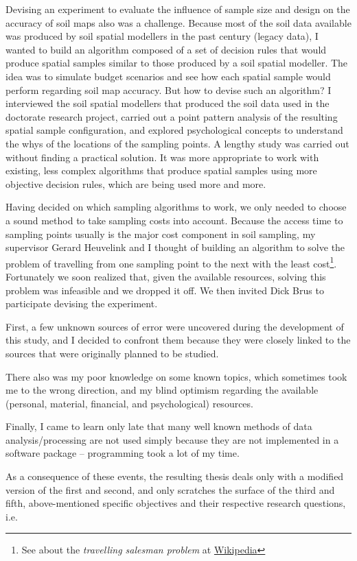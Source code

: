 Devising an experiment to evaluate the influence of sample size and design on the accuracy of soil maps also 
was a challenge. Because most of the soil data available was produced by soil spatial modellers in the past 
century (legacy data), I wanted to build an algorithm composed of a set of decision rules that would produce 
spatial samples similar to those produced by a soil spatial modeller. The idea was to simulate budget 
scenarios and see how each spatial sample would perform regarding soil map accuracy. But how to devise such an 
algorithm? I interviewed the soil spatial modellers that produced the soil data used in the doctorate research 
project, carried out a point pattern analysis of the resulting spatial sample configuration, and explored 
psychological concepts to understand the whys of the locations of the sampling points. A lengthy study was 
carried out without finding a practical solution. It was more appropriate to work with existing, less complex 
algorithms that produce spatial samples using more objective decision rules, which are being used more and 
more.




Having decided on which sampling algorithms to work, we only needed to choose a sound method to take sampling 
costs into account. Because the access time to sampling points usually is the major cost component in soil 
sampling, my supervisor Gerard Heuvelink and I thought of building an algorithm to solve the problem of 
travelling from one sampling point to the next with the least cost\footnote{See about the \emph{travelling 
salesman problem} at \href{https://en.wikipedia.org/wiki/Travelling_salesman_problem}{Wikipedia}}. 
Fortunately we soon realized that, given the available resources, solving this problem was infeasible and we 
dropped it off. We then invited Dick Brus to participate devising the experiment.



First, a few unknown sources of error were uncovered during the development of this study, and I decided to 
confront them because they were closely linked to the sources that were originally planned to be studied. 

There also was my poor knowledge on some known topics, which sometimes took me to the wrong direction, and my 
blind optimism regarding the available (personal, material, financial, and psychological) resources.

Finally, I came to learn only late that many well known methods of data analysis/processing are not used 
simply because they are not implemented in a software package -- programming took a lot of my time.

As a consequence of these events, the resulting thesis deals only with a modified version of the first and 
second, and only scratches the surface of the third and fifth, above-mentioned specific objectives and their 
respective research questions, i.e.
